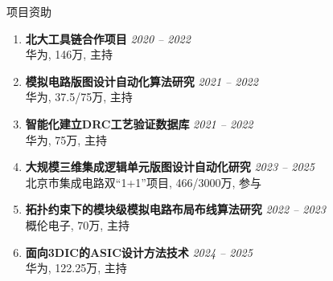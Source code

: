 \begin{rSection}{项目资助}
\begin{enumerate}[font=\normalfont]
\item 
{\bf 北大工具链合作项目 } \hfill{\em 2020 -- 2022} \\
华为, 146万, 主持

\item 
{\bf 模拟电路版图设计自动化算法研究 } \hfill{\em 2021 -- 2022} \\
华为, 37.5/75万, 主持

\item 
{\bf 智能化建立DRC工艺验证数据库 } \hfill{\em 2021 -- 2022} \\
华为, 75万, 主持

\item 
{\bf 大规模三维集成逻辑单元版图设计自动化研究 } \hfill{\em 2023 -- 2025} \\
北京市集成电路双``1+1''项目, 466/3000万, 参与

\item 
{\bf 拓扑约束下的模块级模拟电路布局布线算法研究 } \hfill{\em 2022 -- 2023} \\
概伦电子, 70万, 主持

\item 
{\bf 面向3DIC的ASIC设计方法技术 } \hfill{\em 2024 -- 2025} \\
华为, 122.25万, 主持

\end{enumerate}

\end{rSection}

